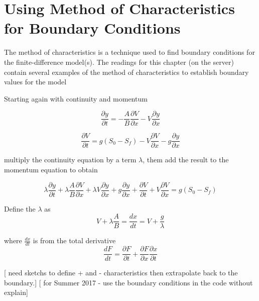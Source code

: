 \section{Using Method of Characteristics for Boundary Conditions}
The method of characteristics is a technique used to find boundary conditions for the finite-difference model(s).
The readings for this chapter (on the server) contain several examples of the method of characteristics to establish boundary values for the model

Starting again with continuity and momentum

\begin{equation}
\frac{\partial y}{\partial t} = -\frac{A}{B}\frac{\partial V}{\partial x}-V\frac{\partial y}{\partial x}
\end{equation}

\begin{equation}
\frac{\partial V}{\partial t} = g(S_0-S_f)-V\frac{\partial V}{\partial x}-g\frac{\partial y}{\partial x}
\end{equation}

multiply the continuity equation by a term $\lambda$, them add the result to the momentum equation to obtain

\begin{equation}
\lambda \frac{\partial y}{\partial t} + \lambda \frac{A}{B}\frac{\partial V}{\partial x} + 
\lambda V\frac{\partial y}{\partial x} + g\frac{\partial y}{\partial x} + 
\frac{\partial V}{\partial t} + V\frac{\partial V}{\partial x}= g(S_0-S_f)
\end{equation}

Define the $\lambda$ as
\begin{equation}
V + \lambda \frac{A}{B} = \frac{dx}{dt} = V + \frac{g}{\lambda}
\end{equation}

where $\frac{dx}{dt}$ is from the total derivative
\begin{equation}
\frac{dF}{dt} = \frac{\partial F}{\partial t} + \frac{\partial F}{\partial x}\frac{\partial x}{\partial t}
\end{equation}

[ need sketchs to define + and - characteristics then extrapolate back to the boundary.]
[ for Summer 2017 - use the boundary conditions in the code without explain]
